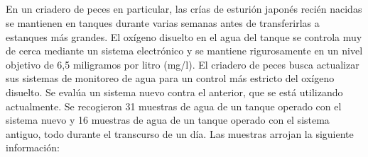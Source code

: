 \documentclass[11pt,letterpaper]{report}
\begin{document}


       \subsection{}%
         En un criadero de peces en particular, las crías de esturión japonés recién nacidas se mantienen en tanques durante varias semanas antes de transferirlas a estanques más grandes. El oxígeno disuelto en el agua del tanque se controla muy de cerca mediante un sistema electrónico y se mantiene rigurosamente en un nivel objetivo de 6,5 miligramos por litro (mg/l). El criadero de peces busca actualizar sus sistemas de monitoreo de agua para un control más estricto del oxígeno disuelto. Se evalúa un sistema nuevo contra el anterior, que se está utilizando actualmente. Se recogieron 31 muestras de agua de un tanque operado con el sistema nuevo y 16 muestras de agua de un tanque operado con el sistema antiguo, todo durante el transcurso de un día. Las muestras arrojan la siguiente información:
\end{document}
